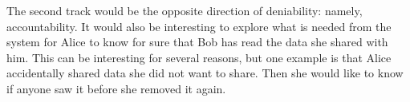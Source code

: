 The second track would be the opposite direction of deniability: namely, 
accountability.
It would also be interesting to explore what is needed from the system for 
Alice to know for sure that Bob has read the data she shared with him.
This can be interesting for several reasons, but one example is that Alice 
accidentally shared data she did not want to share.
Then she would like to know if anyone saw it before she removed it again.





\begin{frame}
\printbibliography{}
\end{frame}
